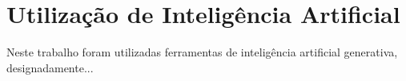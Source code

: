 \documentclass[a4paper,openright,twoside,11pt]{report}
\begin{document}


\cleardoublepage
\chapter*{Utilização de Inteligência Artificial}
Neste trabalho foram utilizadas ferramentas de inteligência artificial generativa, designadamente...\\

\cleardoublepage
\tableofcontents \cleardoublepage


\setcounter{page}{1}












\appendix

\end{document}
